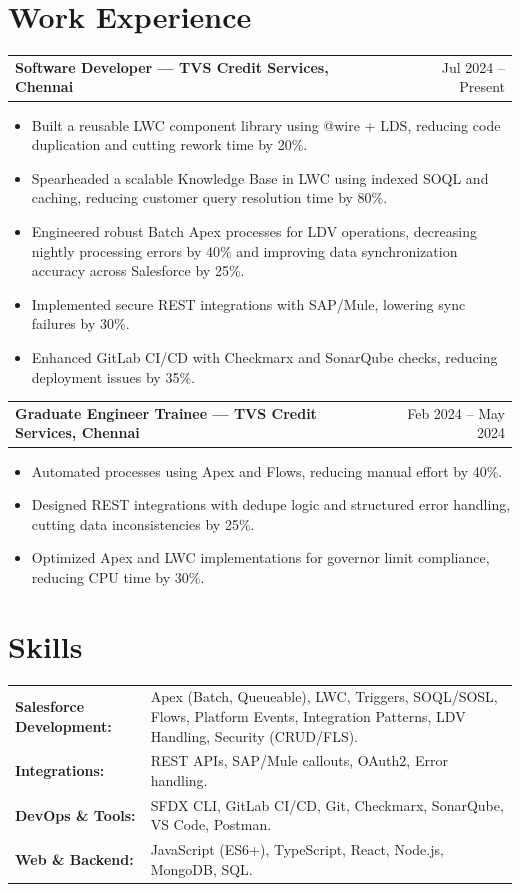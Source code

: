 \documentclass[a4paper,10pt]{article}
\makeatletter
\newenvironment{joblong}[2]
{
    \begin{tabularx}{\linewidth}{@{}l X r@{}}
    \textbf{#1} & \hfill & #2 \\[3.75pt]
    \end{tabularx}
    \begin{minipage}[t]{\linewidth}
    \begin{itemize}[nosep,after=\strut,leftmargin=1em,itemsep=3pt,label=--]
}
{
    \end{itemize}
    \end{minipage}    
}
\makeatother
\begin{document}
\section*{Work Experience}

\begin{joblong}{Software Developer — TVS Credit Services, Chennai}{Jul 2024 -- Present}
\item Built a reusable LWC component library using @wire + LDS, reducing code duplication and cutting rework time by 20\%.
\item Spearheaded a scalable Knowledge Base in LWC using indexed SOQL and caching, reducing customer query resolution time by 80\%.
\item Engineered robust Batch Apex processes for LDV operations, decreasing nightly processing errors by 40\% and improving data synchronization accuracy across Salesforce by 25\%.
\item Implemented secure REST integrations with SAP/Mule, lowering sync failures by 30\%.
\item Enhanced GitLab CI/CD with Checkmarx and SonarQube checks, reducing deployment issues by 35\%.
\end{joblong}

\begin{joblong}{Graduate Engineer Trainee — TVS Credit Services, Chennai}{Feb 2024 -- May 2024}
\item Automated processes using Apex and Flows, reducing manual effort by 40\%.
\item Designed REST integrations with dedupe logic and structured error handling, cutting data inconsistencies by 25\%.
\item Optimized Apex and LWC implementations for governor limit compliance, reducing CPU time by 30\%.
\end{joblong}

\section*{Skills}
\begin{tabularx}{\linewidth}{@{}l X@{}}
\textbf{Salesforce Development:} & Apex (Batch, Queueable), LWC, Triggers, SOQL/SOSL, Flows, Platform Events, Integration Patterns, LDV Handling, Security (CRUD/FLS). \\
\textbf{Integrations:} & REST APIs, SAP/Mule callouts, OAuth2, Error handling. \\
\textbf{DevOps \& Tools:} & SFDX CLI, GitLab CI/CD, Git, Checkmarx, SonarQube, VS Code, Postman. \\
\textbf{Web \& Backend:} & JavaScript (ES6+), TypeScript, React, Node.js, MongoDB, SQL. \\
\end{tabularx}
\end{document}
